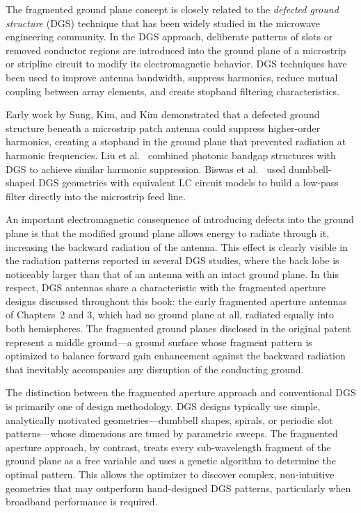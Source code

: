 The fragmented ground plane concept is closely related to the \emph{defected ground structure} (DGS) technique that has been widely studied in the microwave engineering community.  In the DGS approach, deliberate patterns of slots or removed conductor regions are introduced into the ground plane of a microstrip or stripline circuit to modify its electromagnetic behavior.  DGS techniques have been used to improve antenna bandwidth, suppress harmonics, reduce mutual coupling between array elements, and create stopband filtering characteristics.

Early work by Sung, Kim, and Kim \cite{Sung2003DGS} demonstrated that a defected ground structure beneath a microstrip patch antenna could suppress higher-order harmonics, creating a stopband in the ground plane that prevented radiation at harmonic frequencies.  Liu et al.\ \cite{Liu2005DGS} combined photonic bandgap structures with DGS to achieve similar harmonic suppression.  Biswas et al.\ \cite{Biswas2016DGS} used dumbbell-shaped DGS geometries with equivalent LC circuit models to build a low-pass filter directly into the microstrip feed line.

An important electromagnetic consequence of introducing defects into the ground plane is that the modified ground plane allows energy to radiate through it, increasing the backward radiation of the antenna.  This effect is clearly visible in the radiation patterns reported in several DGS studies, where the back lobe is noticeably larger than that of an antenna with an intact ground plane.  In this respect, DGS antennas share a characteristic with the fragmented aperture designs discussed throughout this book: the early fragmented aperture antennas of Chapters~2 and 3, which had no ground plane at all, radiated equally into both hemispheres.  The fragmented ground planes disclosed in the original patent \cite{MaloneyFragPatent} represent a middle ground---a ground surface whose fragment pattern is optimized to balance forward gain enhancement against the backward radiation that inevitably accompanies any disruption of the conducting ground.

The distinction between the fragmented aperture approach and conventional DGS is primarily one of design methodology.  DGS designs typically use simple, analytically motivated geometries---dumbbell shapes, spirals, or periodic slot patterns---whose dimensions are tuned by parametric sweeps.  The fragmented aperture approach, by contrast, treats every sub-wavelength fragment of the ground plane as a free variable and uses a genetic algorithm to determine the optimal pattern.  This allows the optimizer to discover complex, non-intuitive geometries that may outperform hand-designed DGS patterns, particularly when broadband performance is required.

